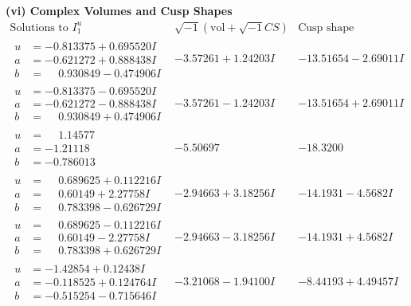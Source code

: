 \documentclass[1p]{elsarticle_modified}
\theoremstyle{definition}
\newcommand{\I}{\sqrt{-1}}
\begin{document}
\newpage\flushleft \textbf{(vi) Complex Volumes and Cusp Shapes}
$$\begin{array}{c|c|c}  
\text{Solutions to }I^u_{1}& \I (\text{vol} + \sqrt{-1}CS) & \text{Cusp shape}\\
 \hline 
\begin{aligned}
u &= -0.813375 + 0.695520 I \\
a &= -0.621272 + 0.888438 I \\
b &= \phantom{-}0.930849 - 0.474906 I\end{aligned}
 & -3.57261 + 1.24203 I & -13.51654 - 2.69011 I \\ \hline\begin{aligned}
u &= -0.813375 - 0.695520 I \\
a &= -0.621272 - 0.888438 I \\
b &= \phantom{-}0.930849 + 0.474906 I\end{aligned}
 & -3.57261 - 1.24203 I & -13.51654 + 2.69011 I \\ \hline\begin{aligned}
u &= \phantom{-}1.14577\phantom{ +0.000000I} \\
a &= -1.21118\phantom{ +0.000000I} \\
b &= -0.786013\phantom{ +0.000000I}\end{aligned}
 & -5.50697\phantom{ +0.000000I} & -18.3200\phantom{ +0.000000I} \\ \hline\begin{aligned}
u &= \phantom{-}0.689625 + 0.112216 I \\
a &= \phantom{-}0.60149 + 2.27758 I \\
b &= \phantom{-}0.783398 - 0.626729 I\end{aligned}
 & -2.94663 + 3.18256 I & -14.1931 - 4.5682 I \\ \hline\begin{aligned}
u &= \phantom{-}0.689625 - 0.112216 I \\
a &= \phantom{-}0.60149 - 2.27758 I \\
b &= \phantom{-}0.783398 + 0.626729 I\end{aligned}
 & -2.94663 - 3.18256 I & -14.1931 + 4.5682 I \\ \hline\begin{aligned}
u &= -1.42854 + 0.12438 I \\
a &= -0.118525 + 0.124764 I \\
b &= -0.515254 - 0.715646 I\end{aligned}
 & -3.21068 - 1.94100 I & -8.44193 + 4.49457 I \\ \hline\begin{aligned}

\end{aligned}
\end{array}$$
\end{document}
